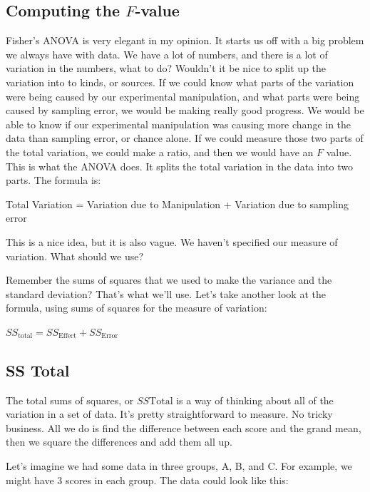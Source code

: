 \documentclass[
  letterpaper,
  DIV=11,
  numbers=noendperiod]{scrreprt}
\begin{document}
\subsection{\texorpdfstring{Computing the
\(F\)-value}{Computing the F-value}}\label{computing-the-f-value}

Fisher's ANOVA is very elegant in my opinion. It starts us off with a
big problem we always have with data. We have a lot of numbers, and
there is a lot of variation in the numbers, what to do? Wouldn't it be
nice to split up the variation into to kinds, or sources. If we could
know what parts of the variation were being caused by our experimental
manipulation, and what parts were being caused by sampling error, we
would be making really good progress. We would be able to know if our
experimental manipulation was causing more change in the data than
sampling error, or chance alone. If we could measure those two parts of
the total variation, we could make a ratio, and then we would have an
\(F\) value. This is what the ANOVA does. It splits the total variation
in the data into two parts. The formula is:

Total Variation = Variation due to Manipulation + Variation due to
sampling error

This is a nice idea, but it is also vague. We haven't specified our
measure of variation. What should we use?

Remember the sums of squares that we used to make the variance and the
standard deviation? That's what we'll use. Let's take another look at
the formula, using sums of squares for the measure of variation:

\(SS_\text{total} = SS_\text{Effect} + SS_\text{Error}\)

\subsection{SS Total}\label{ss-total}

The total sums of squares, or \(SS\text{Total}\) is a way of thinking
about all of the variation in a set of data. It's pretty straightforward
to measure. No tricky business. All we do is find the difference between
each score and the grand mean, then we square the differences and add
them all up.

Let's imagine we had some data in three groups, A, B, and C. For
example, we might have 3 scores in each group. The data could look like
this:
\end{document}
